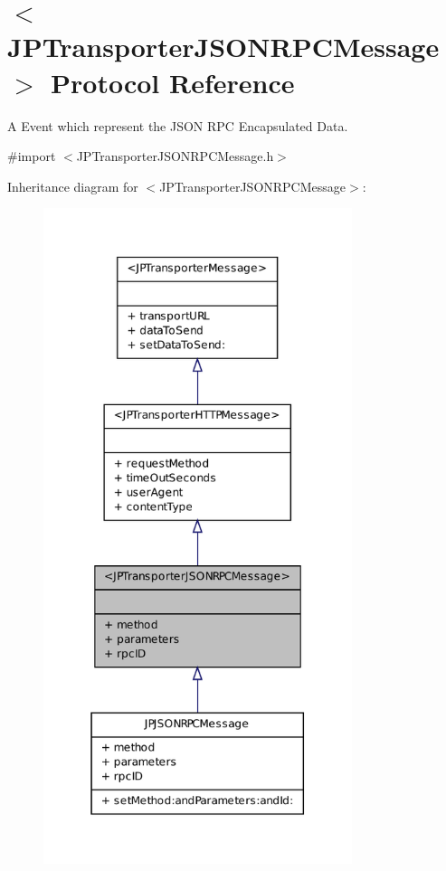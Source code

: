 \hypertarget{a00041}{
\section{$<$JPTransporterJSONRPCMessage$>$ Protocol Reference}
\label{a00041}
}


A Event which represent the JSON RPC Encapsulated Data.  




{\ttfamily \#import $<$JPTransporterJSONRPCMessage.h$>$}



Inheritance diagram for $<$JPTransporterJSONRPCMessage$>$:\nopagebreak
\begin{figure}[H]
\begin{center}
\leavevmode
\includegraphics[width=256pt]{a00170}
\end{center}
\end{figure}


